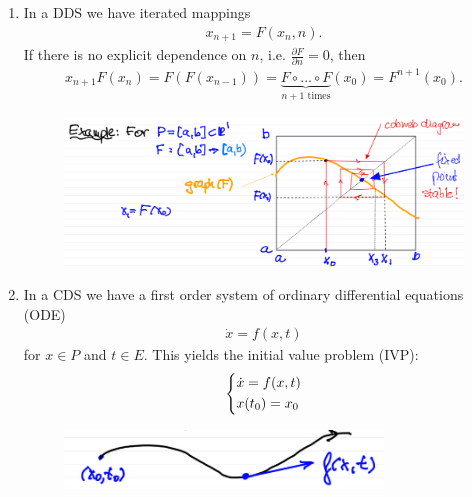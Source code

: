 \begin{enumerate}
	\item In a DDS we have iterated mappings 
	\begin{align}
		\boxed{x_{n+1} = F(x_n , n).}	
	\end{align}
	If there is no explicit dependence on $n$, i.e. $\frac{\partial F}{\partial n} = 0$, then 
	\begin{align}
		\boxed{ x_{n+1} F(x_n) = F(F(x_{n-1})) = \underbrace{F \circ \ldots \circ F}_{n+1 \textrm{ times} }(x_0) = F^{n+1}(x_0).}
	\end{align}
\begin{ex}[]
	\begin{figure}[h]
	\centering
	\includegraphics[width = \textwidth]{figures/intro/1DDS.png}
\end{figure}
\end{ex}

\item In a CDS we have a first order system of ordinary differential equations (ODE)
	\begin{align}
		\boxed{
			\dot{x} = f(x,t)
		}
	\end{align}
	for $x\in P$ and $t \in E$. This yields the initial value problem (IVP):
	\begin{align}
		\begin{dcases}
			\dot{x} = f(x,t) \\
			x(t_0) = x_0
		\end{dcases}
	\end{align}
	\begin{figure}[h]
	\centering
	\includegraphics[width = 0.8\textwidth]{figures/intro/2CDS.png}
	\end{figure}
	

\end{enumerate}
